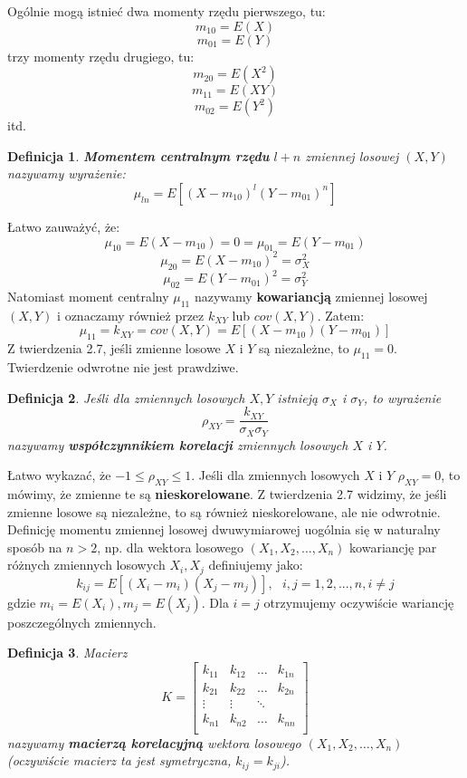 \documentclass[10pt,a4paper]{article}
\newtheorem{definition}{Definicja}[section]
\numberwithin{equation}{subsection}
\begin{document}
Ogólnie mogą istnieć dwa momenty rzędu pierwszego, tu:
\[m_{10} = E(X)\]
\[m_{01} = E(Y)\]
trzy momenty rzędu drugiego, tu:
\[m_{20} = E(X^2)\]
\[m_{11} = E(XY)\]
\[m_{02} = E(Y^2)\]
itd.
\begin{definition}
  \textbf{Momentem centralnym rzędu} $l+n$ zmiennej losowej $(X,Y)$ nazywamy
  wyrażenie:
  \begin{equation}
    \mu_{ln} = E[(X-m_{10})^l(Y-m_{01})^n]
  \end{equation}
\end{definition}
Łatwo zauważyć, że:
\[\mu_{10} = E(X-m_{10}) = 0 = \mu_{01} = E(Y-m_{01}) \]
\[\mu_{20} = E(X-m_{10})^2 = \sigma_X^2\]
\[\mu_{02} = E(Y-m_{01})^2 = \sigma_Y^2\]
Natomiast moment centralny $\mu_{11}$ nazywamy \textbf{kowariancją} zmiennej losowej $(X,Y)$ i oznaczamy również przez $k_{XY}$ lub $cov(X,Y)$.
Zatem:
\[\mu_{11} = k_{XY} = cov(X,Y) = E[(X-m_{10})(Y-m_{01})]\]
Z twierdzenia 2.7, jeśli zmienne losowe $X$ i $Y$ są niezależne, to $\mu_{11} = 0$. Twierdzenie odwrotne nie jest prawdziwe.
\begin{definition}
Jeśli dla zmiennych losowych $X, Y$ istnieją $\sigma_X$ i $\sigma_Y$, to wyrażenie
\begin{equation}
\rho_{XY} = \frac{k_{XY}}{\sigma_X\sigma_Y}
\end{equation}
nazywamy \textbf{współczynnikiem korelacji} zmiennych losowych $X$ i $Y$.
\end{definition}
Łatwo wykazać, że $-1\leq \rho_{XY} \leq 1$. Jeśli dla zmiennych losowych $X$ i $Y$ $\rho_{XY} = 0$, to mówimy, że zmienne te są
\textbf{nieskorelowane}.
Z twierdzenia 2.7 widzimy, że jeśli zmienne losowe są niezależne, to są również nieskorelowane, ale nie odwrotnie. Definicję momentu 
zmiennej losowej dwuwymiarowej uogólnia się w naturalny sposób na $n>2$, np. dla wektora losowego $(X_1, X_2, ..., X_n)$ kowariancję par
różnych zmiennych losowych $X_i,X_j$ definiujemy jako:
\begin{equation}
k_{ij}=E[(X_i-m_i)(X_j-m_j)],~~~i,j=1,2,...,n, i\neq j
\end{equation}
gdzie $m_i = E(X_i), m_j = E(X_j)$.
Dla $i=j$ otrzymujemy oczywiście wariancję poszczególnych zmiennych.
\begin{definition}
Macierz 
\begin{equation}
K = \left[ \begin{array}{llll}
k_{11} & k_{12} & \ldots &k_{1n} \\
k_{21} & k_{22} & \ldots &k_{2n} \\
\vdots & \vdots & \ddots \\
k_{n1} & k_{n2} & \ldots &k_{nn} \\
\end{array} \right]
\end{equation}
nazywamy \textbf{macierzą korelacyjną} wektora losowego $(X_1,X_2,\ldots,X_n)$ (oczywiście macierz ta jest symetryczna, $k_{ij}=k_{ji}$).
\end{definition}
\end{document}
